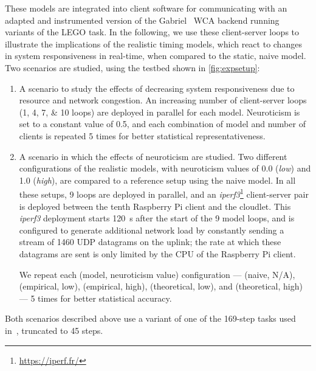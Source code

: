 These models are integrated into client software for communicating with an adapted and instrumented version of the Gabriel~\cite{Chen2015LEGO,Chen2018application} \ac{WCA} backend running variants of the LEGO task.
In the following, we use these client-server loops to illustrate the implications of the realistic timing models, which react to changes in system responsiveness in real-time, when compared to the static, naive model.
Two scenarios are studied, using the testbed shown in \cref{fig:expsetup}:
\begin{enumerate}
    \item\label{verification:scaling} A scenario to study the effects of decreasing system responsiveness due to resource and network congestion.
    An increasing number of client-server loops (\numlist{1;4;7;10} loops) are deployed in parallel for each model.
    Neuroticism is set to a constant value of \num{0.5}, and each combination of model and number of clients is repeated \num{5} times for better statistical representativeness.
    \item\label{verification:neuro} A scenario in which the effects of neuroticism are studied.
    Two different configurations of the realistic models, with neuroticism values of \num{0.0} (\emph{low}) and \num{1.0} (\emph{high}), are compared to a reference setup using the naive model.
    In all these setups, \num{9} loops are deployed in parallel, and an \emph{iperf3}\footnote{\href{https://iperf.fr/}{https://iperf.fr/}} client-server pair is deployed between the tenth Raspberry Pi client and the cloudlet.
    This \emph{iperf3} deployment starts \SI{120}{\second} after the start of the \num{9} model loops, and is configured to generate additional network load by constantly sending a stream of \SI{1460}{\byte} \ac{UDP} datagrams on the uplink; the rate at which these datagrams are sent is only limited by the \acs{CPU} of the Raspberry Pi client.


    We repeat each (model, neuroticism value) configuration --- (naive, \acs{N/A}), (empirical, low), (empirical, high), (theoretical, low), and (theoretical, high) --- \num{5} times for better statistical accuracy.
\end{enumerate}

Both scenarios described above use a variant of one of the \num{169}-step tasks used in~\cite{olguinmunoz:impact2021}, truncated to \num{45} steps.

\medskip

